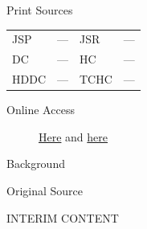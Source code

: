 				\begin{description}
					\item[Print Sources]
				\end{description}

					\begin{tabular}{p{0.5in}p{1in}p{0.5in}p{1in}}
					JSP	 	& ---		& JSR 		& --- \\
					DC	 	& ---		& HC 		& --- \\
					HDDC 	& ---		& TCHC 		& --- \\
					\end{tabular}
				
				\begin{description}
					\item[Online Access] \href{https://www.josephsmithpapers.org/paper-summary/discourse-6-april-1843-b-as-reported-by-franklin-d-richards/1}{Here} and \href{https://www.josephsmithpapers.org/paper-summary/discourse-8-april-1843-as-reported-by-franklin-d-richards/1}{here}
				\end{description}
				
				\begin{description}
					\item[Background]
				\end{description}
				
				
				\begin{description}
					\item[Original Source]
				\end{description}
				
					INTERIM CONTENT
					
				
